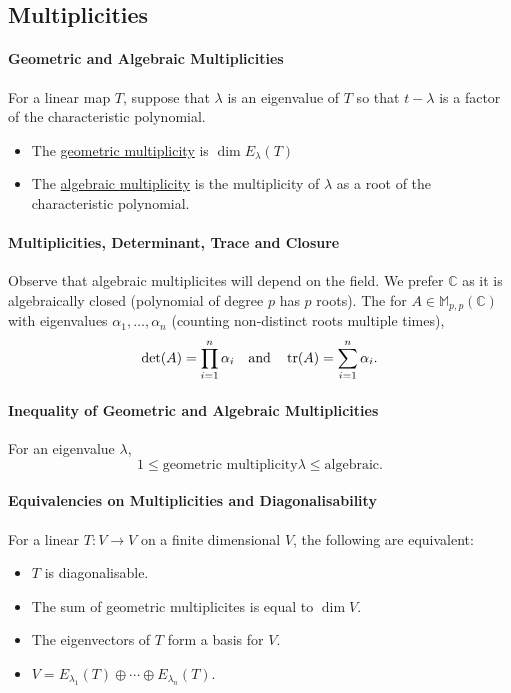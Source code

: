 %
%
%
\subsection{Multiplicities}

\paragraph{Geometric and Algebraic Multiplicities}
For a linear map \( T \), suppose that \( \lambda \)
is an eigenvalue of \( T \) so that \( t - \lambda \) is a factor
of the characteristic polynomial.
\begin{itemize}
    \item The \underline{geometric multiplicity} is \( \dim E_\lambda(T) \)
    \item The \underline{algebraic multiplicity} is the multiplicity of
        \( \lambda \) as a root of the characteristic polynomial.
\end{itemize}

\paragraph{Multiplicities, Determinant, Trace and Closure}
Observe that algebraic multiplicites will depend on the field. We prefer
\( \mathbb{C} \) as it is algebraically closed (polynomial of degree \( p \)
has \( p \) roots).
The for \( A \in \mathbb{M}_{p, p}(\mathbb{C}) \) with eigenvalues
\( \alpha_1, \dots, \alpha_n \) (counting non-distinct roots multiple times),
\[
    \det (A) = \prod_{i = 1}^n \alpha_i
    \quad\text{and}\quad
    \tr(A) = \sum_{i = 1}^n \alpha_i.
\]

\paragraph{Inequality of Geometric and Algebraic Multiplicities}
For an eigenvalue \( \lambda \), \[
    1 \leq \text{geometric multiplicity} \lambda \leq \text{algebraic}
.\]

\paragraph{Equivalencies on Multiplicities and Diagonalisability}
For a linear \( T: V \to V \) on a finite dimensional \( V \),
the following are equivalent:
\begin{itemize}
    \item \( T \) is diagonalisable.
    \item The sum of geometric multiplicites is equal to \( \dim V \).
    \item The eigenvectors of \( T \) form a basis for \( V \).
    \item \( V = E_{\lambda_1}(T) \oplus \cdots \oplus E_{\lambda_n}(T) \).
\end{itemize}

